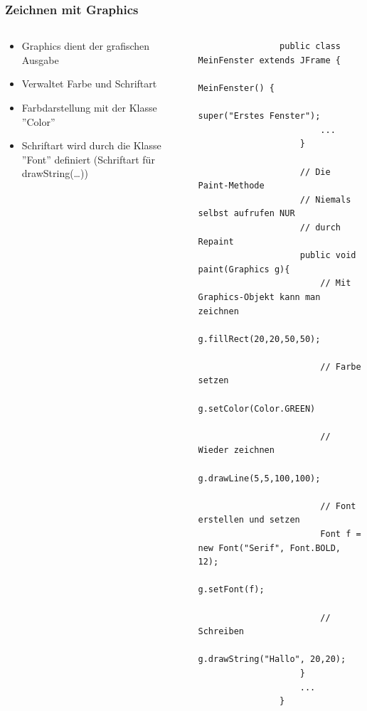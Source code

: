 \begin{frame}[fragile]
	\frametitle{Zeichnen mit Graphics}
	\begin{columns}
		\begin{column}{0.4\textwidth}
			\small
			\begin{itemize}
			  \item Graphics dient der grafischen Ausgabe
			  \item Verwaltet Farbe und Schriftart
			  \item Farbdarstellung mit der Klasse ''Color''
			  \item Schriftart wird durch die Klasse ''Font''
			  definiert (Schriftart f\"ur drawString(\ldots))
	\end{itemize}
	\end{column}
		\begin{column}{0.6\textwidth}
			\begin{lstlisting}
				public class MeinFenster extends JFrame {
					MeinFenster() {
						super("Erstes Fenster");
						...
					}
					
					// Die Paint-Methode
					// Niemals selbst aufrufen NUR  
					// durch Repaint
					public void paint(Graphics g){
						// Mit Graphics-Objekt kann man zeichnen
						g.fillRect(20,20,50,50);
						
						// Farbe setzen
						g.setColor(Color.GREEN)
						
						// Wieder zeichnen
						g.drawLine(5,5,100,100);
						
						// Font erstellen und setzen
						Font f = new Font("Serif", Font.BOLD, 12);
						g.setFont(f);
						
						// Schreiben
						g.drawString("Hallo", 20,20);
					}
					...
				}
			\end{lstlisting}
		\end{column}
	\end{columns}
\end{frame}

